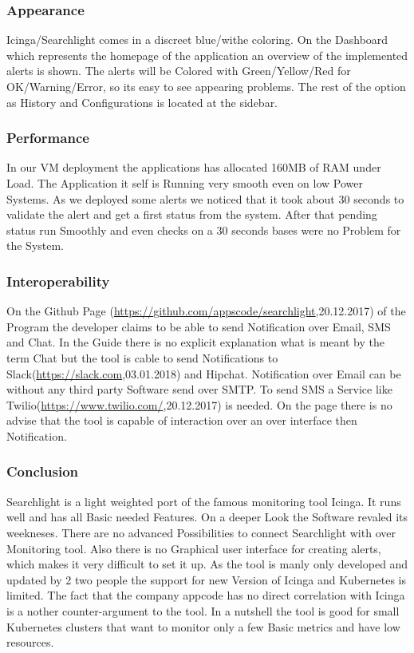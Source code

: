\subsubsection{Appearance}
Icinga/Searchlight comes in a  discreet blue/withe coloring. On the Dashboard which represents the homepage of the application an overview of the implemented alerts is shown. The alerts will be Colored with Green/Yellow/Red for OK/Warning/Error, so its easy to see appearing problems. The rest of the option as History and Configurations is located at the sidebar. 
\subsubsection{Performance}
In our VM deployment the applications has allocated 160MB of RAM under Load. The Application it self is Running very smooth even on low Power Systems. As we deployed some alerts we noticed that it took about 30 seconds to validate the alert and get a first status from the system. After that pending status run Smoothly and even checks on a 30 seconds bases were no Problem for the System.
\subsubsection{Interoperability}
On the Github Page (\url{https://github.com/appscode/searchlight},20.12.2017) of the Program the developer claims to be able to send Notification over Email, SMS and Chat.
In the Guide there is no explicit explanation what is meant by the term Chat but the tool is cable to send Notifications to Slack(\url{https://slack.com},03.01.2018) and Hipchat. Notification over Email can be without any third party Software send over SMTP. To send SMS a Service like Twilio(\url{https://www.twilio.com/},20.12.2017) is needed.
On the page there is no advise that the tool is capable of interaction over an over interface then Notification. 
\subsubsection{Conclusion}
Searchlight is a light weighted  port of the famous monitoring tool Icinga. It runs well and has all Basic needed Features. On a deeper Look the Software revaled its weekneses. There are no advanced Possibilities to connect Searchlight with over Monitoring tool. Also there is no Graphical user interface for creating alerts, which makes it very difficult to set it up. As the tool is manly only developed and updated by 2 two people the support for new Version of Icinga and Kubernetes is limited. The fact that the company appcode has no direct correlation with Icinga is a nother counter-argument to the tool. In a nutshell the tool is good for small Kubernetes clusters that want to monitor only a few Basic metrics and have low resources. 

